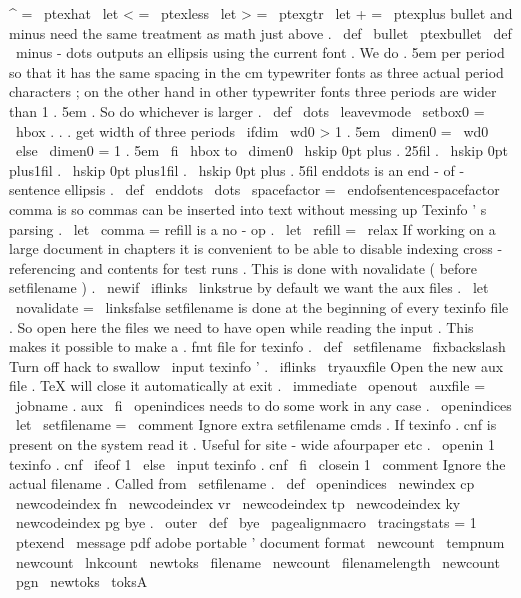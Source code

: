 {{{^
=
\
ptexhat
\
let
<
=
\
ptexless
\
let
>
=
\
ptexgtr
\
let
+
=
\
ptexplus
}
}
%
bullet
and
minus
need
the
same
treatment
as
math
just
above
.
\
def
\
bullet
{
\
ptexbullet
}
\
def
\
minus
{
-
}
%
dots
{
}
outputs
an
ellipsis
using
the
current
font
.
%
We
do
.
5em
per
period
so
that
it
has
the
same
spacing
in
the
cm
%
typewriter
fonts
as
three
actual
period
characters
;
on
the
other
hand
%
in
other
typewriter
fonts
three
periods
are
wider
than
1
.
5em
.
So
do
%
whichever
is
larger
.
%
\
def
\
dots
{
%
\
leavevmode
\
setbox0
=
\
hbox
{
.
.
.
}
%
get
width
of
three
periods
\
ifdim
\
wd0
>
1
.
5em
\
dimen0
=
\
wd0
\
else
\
dimen0
=
1
.
5em
\
fi
\
hbox
to
\
dimen0
{
%
\
hskip
0pt
plus
.
25fil
.
\
hskip
0pt
plus1fil
.
\
hskip
0pt
plus1fil
.
\
hskip
0pt
plus
.
5fil
}
%
}
%
enddots
{
}
is
an
end
-
of
-
sentence
ellipsis
.
%
\
def
\
enddots
{
%
\
dots
\
spacefactor
=
\
endofsentencespacefactor
}
%
comma
{
}
is
so
commas
can
be
inserted
into
text
without
messing
up
%
Texinfo
'
s
parsing
.
%
\
let
\
comma
=
%
refill
is
a
no
-
op
.
\
let
\
refill
=
\
relax
%
If
working
on
a
large
document
in
chapters
it
is
convenient
to
%
be
able
to
disable
indexing
cross
-
referencing
and
contents
for
test
runs
.
%
This
is
done
with
novalidate
(
before
setfilename
)
.
%
\
newif
\
iflinks
\
linkstrue
%
by
default
we
want
the
aux
files
.
\
let
\
novalidate
=
\
linksfalse
%
setfilename
is
done
at
the
beginning
of
every
texinfo
file
.
%
So
open
here
the
files
we
need
to
have
open
while
reading
the
input
.
%
This
makes
it
possible
to
make
a
.
fmt
file
for
texinfo
.
\
def
\
setfilename
{
%
\
fixbackslash
%
Turn
off
hack
to
swallow
\
input
texinfo
'
.
\
iflinks
\
tryauxfile
%
Open
the
new
aux
file
.
TeX
will
close
it
automatically
at
exit
.
\
immediate
\
openout
\
auxfile
=
\
jobname
.
aux
\
fi
%
\
openindices
needs
to
do
some
work
in
any
case
.
\
openindices
\
let
\
setfilename
=
\
comment
%
Ignore
extra
setfilename
cmds
.
%
%
If
texinfo
.
cnf
is
present
on
the
system
read
it
.
%
Useful
for
site
-
wide
afourpaper
etc
.
\
openin
1
texinfo
.
cnf
\
ifeof
1
\
else
\
input
texinfo
.
cnf
\
fi
\
closein
1
%
\
comment
%
Ignore
the
actual
filename
.
}
%
Called
from
\
setfilename
.
%
\
def
\
openindices
{
%
\
newindex
{
cp
}
%
\
newcodeindex
{
fn
}
%
\
newcodeindex
{
vr
}
%
\
newcodeindex
{
tp
}
%
\
newcodeindex
{
ky
}
%
\
newcodeindex
{
pg
}
%
}
%
bye
.
\
outer
\
def
\
bye
{
\
pagealignmacro
\
tracingstats
=
1
\
ptexend
}
\
message
{
pdf
}
%
adobe
portable
'
document
format
\
newcount
\
tempnum
\
newcount
\
lnkcount
\
newtoks
\
filename
\
newcount
\
filenamelength
\
newcount
\
pgn
\
newtoks
\
toksA
}
